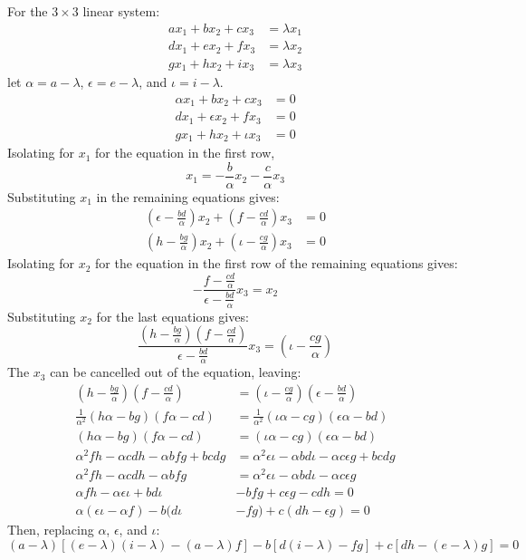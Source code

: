 For the $3 \times 3$ linear system:
\begin{align*}
	ax_1 + bx_2 + cx_3 &= \lambda x_1 \\
	dx_1 + ex_2 + fx_3 &= \lambda x_2 \\
	gx_1 + hx_2 + ix_3 &= \lambda x_3
\end{align*}
let $\alpha = a - \lambda$, $\epsilon = e - \lambda$, and $\iota = i - \lambda$.
\begin{align*}
	\alpha x_1 + bx_2 + cx_3 &= 0 \\
	dx_1 + \epsilon x_2 + fx_3 &= 0 \\
	gx_1 + hx_2 + \iota x_3 &= 0
\end{align*}
Isolating for $x_1$ for the equation in the first row,
\begin{equation*}
	x_1 = - \frac{b}{\alpha} x_2 - \frac{c}{\alpha} x_3
\end{equation*}
Substituting $x_1$ in the remaining equations gives:
\begin{align*}
	\left(\epsilon - \frac{bd}{\alpha}\right)x_2 + \left(f - \frac{cd}{\alpha}\right)x_3 &= 0 \\
	\left(h - \frac{bg}{\alpha}\right)x_2 + \left(\iota - \frac{cg}{\alpha}\right)x_3 &= 0 
\end{align*}
Isolating for $x_2$ for the equation in the first row of the remaining equations gives:
\begin{equation*}
	-\frac{f - \frac{cd}{\alpha}}{\epsilon - \frac{bd}{\alpha}}x_3 = x_2
\end{equation*}
Substituting $x_2$ for the last equations gives:
\begin{equation*}
	\frac{\left(h- \frac{bg}{\alpha}\right)\left(f - \frac{cd}{\alpha}\right)}{\epsilon - \frac{bd}{\alpha}}x_3 = \left(\iota - \frac{cg}{\alpha}\right)
\end{equation*}
The $x_3$ can be cancelled out of the equation, leaving:
\begin{align}
	\left(h - \frac{bg}{\alpha}\right)\left(f - \frac{cd}{\alpha}\right) &= \left(\iota - \frac{cg}{\alpha}\right)\left(\epsilon - \frac{bd}{\alpha}\right) \nonumber \\
	\frac{1}{\alpha^2}(h\alpha - bg)(f\alpha - cd) &= \frac{1}{\alpha^2}(\iota \alpha - cg)(\epsilon \alpha - bd) \nonumber \\
	(h\alpha - bg)(f\alpha - cd) &= (\iota \alpha - cg)(\epsilon \alpha - bd) \nonumber \\
	\alpha^2fh - \alpha cdh - \alpha bfg + bcdg &= \alpha^2 \epsilon \iota - \alpha bd \iota - \alpha c \epsilon g + bcdg \nonumber \\
	\alpha^2fh - \alpha cdh - \alpha bfg &= \alpha^2 \epsilon \iota - \alpha bd \iota - \alpha c \epsilon g \nonumber \\
	\alpha fh - \alpha \epsilon \iota + bd \iota &- bfg + c \epsilon g - cdh = 0 \nonumber \\
	\alpha (\epsilon \iota - \alpha f) - b(d \iota& - fg) + c(dh - \epsilon g) = 0
\end{align}
Then, replacing $\alpha$, $\epsilon$, and $\iota$:
\begin{equation*}
	(a - \lambda)[(e - \lambda)(i - \lambda) - (a - \lambda)f] - b[d(i - \lambda) - fg] + c[dh - (e- \lambda)g] = 0
\end{equation*}
